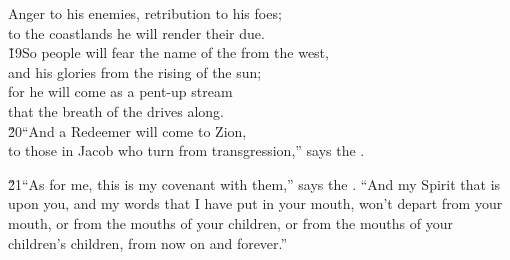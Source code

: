 \begin{poetry}
\poemll    Anger to his enemies, retribution to his foes; \\
\poemlll       to the coastlands he will render their due. \\
\poeml \v{19}So people will fear the name of the  from the west, \\
\poemll    and his glories from the rising of the sun; \\
\poeml for he will come as a pent-up stream \\
\poemll    that the breath of the  drives along. \\
\poeml \v{20}``And a Redeemer will come to Zion, \\
\poemll    to those in Jacob who turn from transgression,'' says the .
\end{poetry}

\v{21}``As for me, this is my covenant with them,'' says the . ``And my Spirit that is upon you, and my words that I have put in your mouth, won't depart from your mouth, or from the mouths of your children, or from the mouths of your children's children, from now on and forever.''

